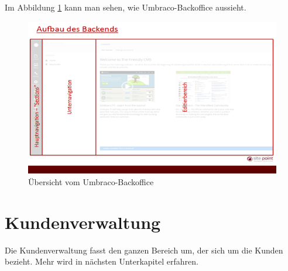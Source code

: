 Im Abbildung \ref{fig:Umbraco Backoffice} kann man sehen, wie Umbraco-Backoffice aussieht.
\begin{figure}[h]
	\centering
	\includegraphics[width=1\linewidth]{Graphics/UmbracoBackend.png}
	\caption[Umbraco Backoffice]{Übersicht vom Umbraco-Backoffice}
	\label{fig:Umbraco Backoffice}
\end{figure}

\pagebreak
\section{Kundenverwaltung}
Die Kundenverwaltung fasst den ganzen Bereich um, der sich um die Kunden bezieht. Mehr wird in nächsten Unterkapitel erfahren.

